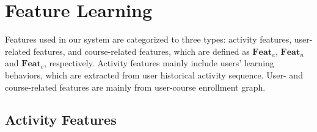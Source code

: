 \section{Feature Learning}
	
	\label{sec:allFeat}
  Features used in our system are categorized to three types: activity features, user-related features, and course-related features, which are defined as $\mathbf{Feat}_a$, $\mathbf{Feat}_u$ and $\mathbf{Feat}_c$, respectively. Activity features mainly include users' learning behaviors, which are extracted from user historical activity sequence. User- and course-related features are mainly from user-course enrollment graph.
  
	\subsection{Activity Features}
	

